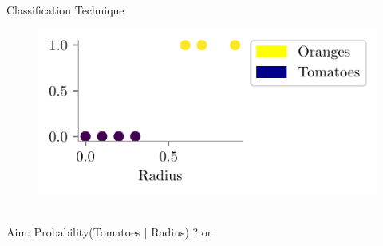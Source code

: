 \documentclass{beamer}
\begin{document}
	\begin{frame}{Classification Technique}
	\begin{minipage}{0.3\textwidth}
		
		\begin{figure}
			
			\includegraphics{../figures/logistic-regression/logistic-orange-tomatoes.pdf}
		\end{figure}
	\end{minipage} \\
	\pause Aim: Probability(Tomatoes $|$ Radius) ? or
	\pause {}
	
\end{frame}
\end{document}
